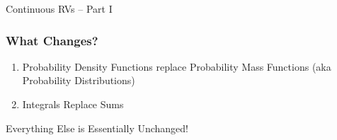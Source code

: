 \documentclass[handout]{beamer}
\date{Lecture \# 11}
\begin{document}
 


\begin{frame}[plain]
	\titlepage 
	

\end{frame} 



\begin{frame}

\centering \Huge Continuous RVs -- Part I

\end{frame}

\begin{frame}
\frametitle{What Changes?}
	\begin{enumerate}
\item Probability Density Functions replace Probability Mass Functions (aka Probability Distributions)
\item Integrals Replace Sums
\end{enumerate}
\begin{alertblock}{Everything Else is Essentially Unchanged!}\end{alertblock}


\end{frame}

\end{document}
